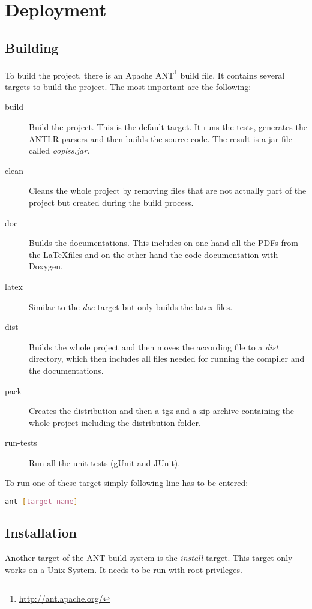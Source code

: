 \chapter{Deployment}

\section{Building}

To build the project, there is an Apache ANT\footnote{\href{http://ant.apache.org/}{http://ant.apache.org/}}
build file. It contains several targets to build the project.
The most important are the following: 

\begin{description}
\item[build] Build the project. This is the default target. It runs
the tests, generates the ANTLR parsers and then builds the source
code. The result is a jar file called \emph{ooplss.jar}.
\item[clean] Cleans the whole project by removing files that are not
actually part of the project but created during the build process.
\item[doc] Builds the documentations. This includes on one hand all
the PDFs from the \LaTeX files and on the other hand the code
documentation with Doxygen.
\item[latex] Similar to the \emph{doc} target but only builds the
latex files.
\item[dist] Builds the whole project and then moves the
according file to a \emph{dist} directory, which then
includes all files needed for running the compiler and the documentations.
\item[pack] Creates the distribution and then a tgz and a zip archive containing
the whole project including the distribution folder.
\item[run-tests] Run all the unit tests (gUnit and JUnit).
\end{description}

To run one of these target simply following line has to be entered:
\begin{lstlisting}[language=bash,caption=Running the ant build system]
ant [target-name]
\end{lstlisting}

\section{Installation}

Another target of the ANT build system is the \emph{install} target.
This target only works on a Unix-System. It needs to be run with root
privileges.

